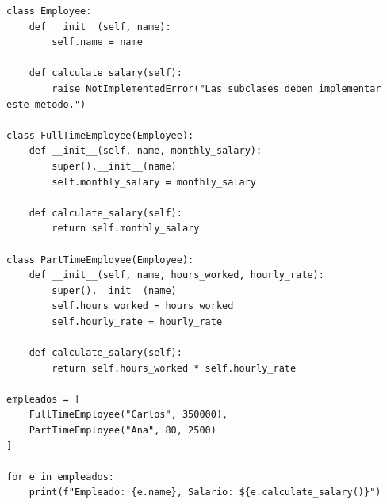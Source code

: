 \begin{lstlisting}[caption={Polimorfismo aplicado al cálculo de salarios.}, label={list:polimorfismo_empleados}]
class Employee:
    def __init__(self, name):
        self.name = name

    def calculate_salary(self):
        raise NotImplementedError("Las subclases deben implementar este metodo.")

class FullTimeEmployee(Employee):
    def __init__(self, name, monthly_salary):
        super().__init__(name)
        self.monthly_salary = monthly_salary

    def calculate_salary(self):
        return self.monthly_salary

class PartTimeEmployee(Employee):
    def __init__(self, name, hours_worked, hourly_rate):
        super().__init__(name)
        self.hours_worked = hours_worked
        self.hourly_rate = hourly_rate

    def calculate_salary(self):
        return self.hours_worked * self.hourly_rate

empleados = [
    FullTimeEmployee("Carlos", 350000),
    PartTimeEmployee("Ana", 80, 2500)
]

for e in empleados:
    print(f"Empleado: {e.name}, Salario: ${e.calculate_salary()}")
\end{lstlisting}
